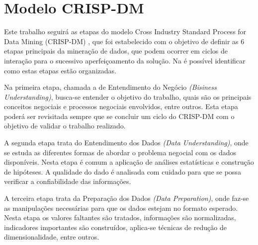 



\section{Modelo CRISP-DM}%

Este trabalho seguirá as etapas do modelo Cross Industry Standard Process for Data Mining (CRISP-DM) \cite{crispdm}, que foi estabelecido com o objetivo de definir as 6 etapas principais da mineração de dados, que podem ocorrer em ciclos de interação para o sucessivo aperfeiçoamento da solução. Na  é possível identificar como estas etapas estão organizadas. 

%

    Na primeira etapa, chamada a de Entendimento do Negócio \textit{(Bisiness Understanding)}, busca-se entender o objetivo do trabalho, quais são os principais conceitos negociais e processos negociais envolvidos, entre outros. Esta etapa poderá ser revisitada sempre que se concluir um ciclo do CRISP-DM com o objetivo de validar o trabalho realizado. 
    
A segunda etapa trata do Entendimento dos Dados \textit{(Data Understanding)}, onde se estuda as diferentes formas de abordar o problema negocial com os dados disponíveis. Nesta etapa é comum a aplicação de análises estatísticas e construção de hipóteses. A qualidade do dado é analisada com cuidado para que se possa verificar a confiabilidade das informações. 

A terceira etapa trata da Preparação dos Dados \textit{(Data Preparation)}, onde faz-se as manipulações necessárias para que os dados estejam no formato esperado. Nesta etapa os valores faltantes são tratados, informações são normalizadas, indicadores importantes são construídos, aplica-se técnicas de redução de dimensionalidade, entre outros. 

